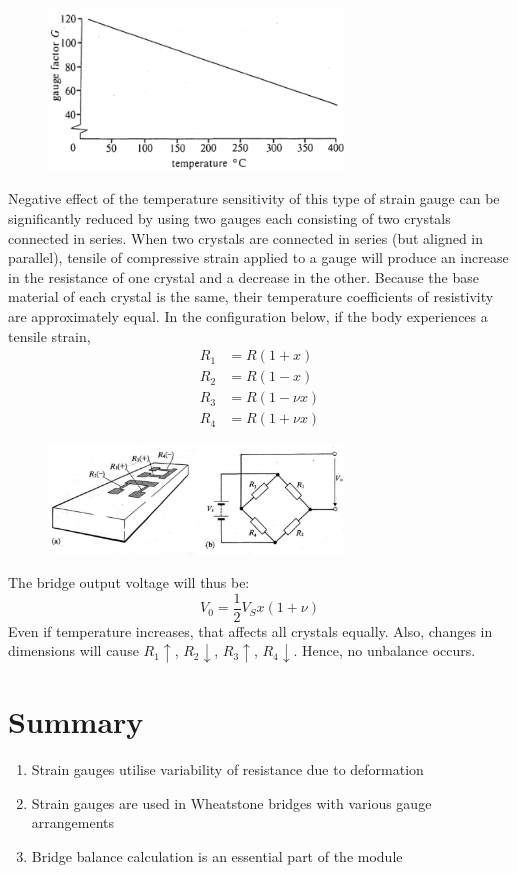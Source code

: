 \documentclass[class=report, crop=false, 12pt,a4paper, tikz, border=4mm]{standalone}
\begin{document}
\begin{figure}[H]
  \centering
  \includegraphics[width = 0.7\textwidth]{../img/diagram21.png}
\end{figure}
Negative effect of the temperature sensitivity of this type of strain gauge can be significantly reduced by using two gauges each consisting of two crystals connected in series. When two crystals are connected in series (but aligned in parallel), tensile of compressive strain applied to a gauge will produce an increase in the resistance of one crystal and a decrease in the other. Because the base material of each crystal is the same, their temperature coefficients of resistivity are approximately equal. In the configuration below, if the body experiences a tensile strain,
\begin{align}
  R_1 &= R(1+x)\\
  R_2 &= R(1-x)\\
  R_3 &= R(1-\nu x)\\
  R_4 &= R(1 + \nu x)
\end{align}
\begin{figure}[H]
  \centering
  \includegraphics[width = 0.7\textwidth]{../img/diagram22.png}
\end{figure}
The bridge output voltage will thus be:
\begin{equation}
  V_0 = \frac{1}{2} V_S x (1 + \nu)
\end{equation}
Even if temperature increases, that affects all crystals equally. Also, changes in dimensions will cause $R_1 \uparrow$, $R_2 \downarrow$, $R_3 \uparrow$, $R_4 \downarrow$. Hence, no unbalance occurs. 
\section{Summary}
\begin{enumerate}
  \item Strain gauges utilise variability of resistance due to deformation
  \item Strain gauges are used in Wheatstone bridges with various gauge arrangements
  \item Bridge balance calculation is an essential part of the module
\end{enumerate}
\end{document}
